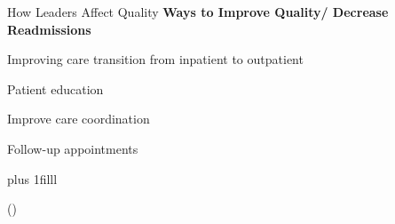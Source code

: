 \documentclass[notes,11pt, aspectratio=169]{beamer}
\newcommand{\btVFill}{\vskip0pt plus 1filll}
\newenvironment{wideitemize}{\itemize\addtolength{\itemsep}{10pt}}{\enditemize}
\begin{document}
\begin{frame}{How Leaders Affect Quality}\label{executivejob}
\large \vspace{5mm}
\textbf{Ways to Improve Quality/ Decrease Readmissions}

\vspace{2mm}

\begin{wideitemize}
    \item Improving care transition from inpatient to outpatient
    \item Patient education
    \item Improve care coordination
    \item Follow-up appointments
\end{wideitemize}

\btVFill

\scriptsize (\cite{silow2011reducing}) \hspace{4mm}
\hyperlink{nonprofithospexec}{}
    
\end{frame}
\end{document}
